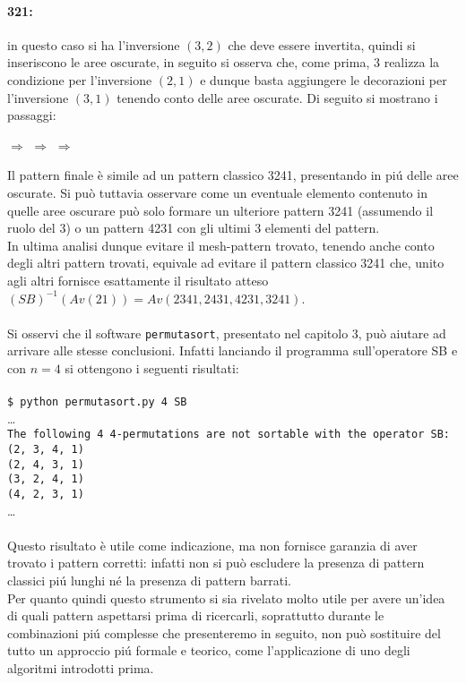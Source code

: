 \paragraph*{321:} in questo caso si ha l'inversione $(3,2)$ che deve essere invertita, quindi si inseriscono le aree oscurate, in seguito si osserva che, come prima, $3$ realizza la condizione per l'inversione $(2,1)$ e dunque basta aggiungere le decorazioni per l'inversione $(3,1)$ tenendo conto delle aree oscurate. Di seguito si mostrano i passaggi:
\begin{center}
$\Rightarrow$
$\Rightarrow$
$\Rightarrow$
\end{center}
Il pattern finale \`e simile ad un pattern classico 3241, presentando in pi\'u delle aree oscurate. Si pu\`o tuttavia osservare come un eventuale elemento contenuto in quelle aree oscurare pu\`o solo formare un ulteriore pattern 3241 (assumendo il ruolo del 3) o un pattern 4231 con gli ultimi 3 elementi del pattern.\\
In ultima analisi dunque evitare il mesh-pattern trovato, tenendo anche conto degli altri pattern trovati, equivale ad evitare il pattern classico 3241 che, unito agli altri fornisce esattamente il risultato atteso $(SB)^{-1}(Av(21))=Av(2341, 2431, 4231, 3241)$.\\\\
Si osservi che il software \texttt{permutasort}, presentato nel capitolo 3, pu\`o aiutare ad arrivare alle stesse conclusioni. Infatti lanciando il programma sull'operatore SB e con $n=4$ si ottengono i seguenti risultati:\\\\\texttt{\$ python permutasort.py 4 SB }\\\dots\\\texttt{The following 4 4-permutations are not sortable with the operator SB:}\\\texttt{(2, 3, 4, 1)}\\\texttt{(2, 4, 3, 1)}\\\texttt{(3, 2, 4, 1)}\\\texttt{(4, 2, 3, 1)}\\\dots\\\\
Questo risultato \`e utile come indicazione, ma non fornisce garanzia di aver trovato i pattern corretti: infatti non si pu\`o escludere la presenza di pattern classici pi\'u lunghi n\'e la presenza di pattern barrati.\\
Per quanto quindi questo strumento si sia rivelato molto utile per avere un'idea di quali pattern aspettarsi prima di ricercarli, soprattutto durante le combinazioni pi\'u complesse che presenteremo in seguito, non pu\`o sostituire del tutto un approccio pi\'u formale e teorico, come l'applicazione di uno degli algoritmi introdotti prima.
